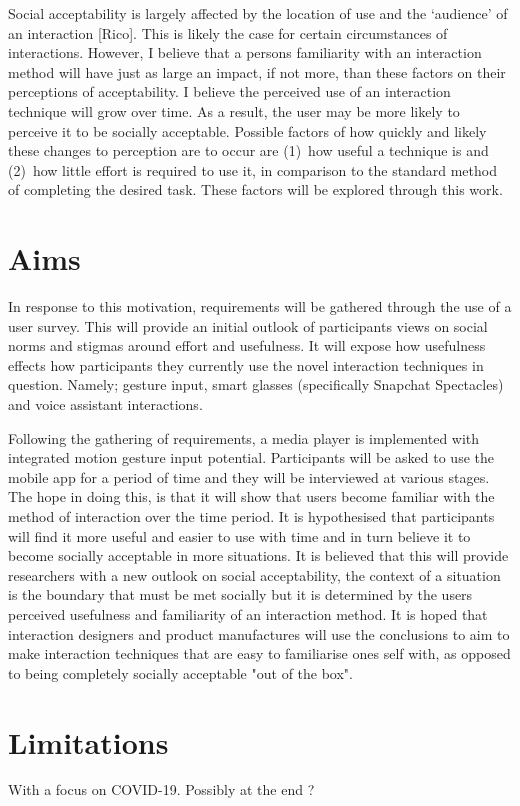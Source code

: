 \documentclass{l4proj}
\begin{document}
Social acceptability is largely affected by the location of use and the `audience' of an interaction [Rico]. This is likely the case for certain circumstances of interactions. However, I believe that a persons familiarity with an interaction method will have just as large an impact, if not more, than these factors on their perceptions of acceptability. I believe the perceived use of an interaction technique will grow over time. As a result, the user may be more likely to perceive it to be socially acceptable. Possible factors of how quickly and likely these changes to perception are to occur are (1)~how useful a technique is and (2)~how little effort is required to use it, in comparison to the standard method of completing the desired task. These factors will be explored through this work.

\section{Aims}
In response to this motivation, requirements will be gathered through the use of a user survey. This will provide an initial outlook of participants views on social norms and stigmas around effort and usefulness. It will expose how usefulness effects how participants they currently use the novel interaction techniques in question. Namely; gesture input, smart glasses (specifically Snapchat Spectacles) and voice assistant interactions. 

Following the gathering of requirements, a media player is implemented with integrated motion gesture input potential. Participants will be asked to use the mobile app for a period of time and they will be interviewed at various stages. The hope in doing this, is that it will show that users become familiar with the method of interaction over the time period. It is hypothesised that participants will find it more useful and easier to use with time and in turn believe it to become socially acceptable in more situations. It is believed that this will provide researchers with a new outlook on social acceptability, the context of a situation is the boundary that must be met socially but it is determined by the users perceived usefulness and familiarity of an interaction method. It is hoped that interaction designers and product manufactures will use the conclusions to aim to make interaction techniques that are easy to familiarise ones self with, as opposed to being completely socially acceptable "out of the box". 
\section{Limitations}
With a focus on COVID-19. Possibly at the end ?
\end{document}
